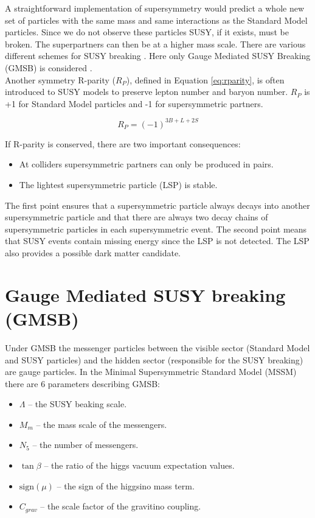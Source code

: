 A straightforward implementation of supersymmetry would predict a whole new set
of particles with the same mass and same interactions as the Standard Model
particles. Since we do not observe these particles SUSY, if it exists, must be 
broken. The superpartners can then be at a higher mass scale. There are various
different schemes for SUSY breaking \cite{atchinson}. Here only Gauge Mediated 
SUSY Breaking (GMSB) is considered \cite{tewort}. \\

Another symmetry R-parity ($R_{P}$), defined in Equation \ref{eq:rparity}, is 
often introduced to SUSY models to preserve lepton number and baryon number. 
$R_{P}$ is +1 for Standard Model particles and -1 for supersymmetric partners.

\begin{equation}
R_{P} = (-1)^{3B+L+2S}
\label{eq:rparity}
\end{equation}

If R-parity is conserved, there are two important consequences:

\begin{itemize}
\item At colliders supersymmetric partners can only be produced in pairs.
\item The lightest supersymmetric particle (LSP) is stable.
\end{itemize}

The first point ensures that a supersymmetric particle always decays into 
another supersymmetric particle and that there are always two decay chains of 
supersymmetric particles in each supersymmetric event. The second point means 
that SUSY events contain missing energy since the LSP is not detected. The LSP 
also provides a possible dark matter candidate.

\section{Gauge Mediated SUSY breaking (GMSB)}

Under GMSB the messenger particles between the visible sector (Standard Model
and SUSY particles) and the hidden sector (responsible for the SUSY breaking)
are gauge particles. In the Minimal Supersymmetric Standard Model (MSSM) there 
are 6 parameters describing GMSB:

\begin{itemize}
\item $\Lambda$ -- the SUSY beaking scale. 
\item $M_{m}$ -- the mass scale of the messengers.
\item $N_{5}$ -- the number of messengers.
\item $\tan\beta$ -- the ratio of the higgs vacuum expectation values.
\item $\mbox{sign}(\mu)$ -- the sign of the higgsino mass term.
\item $C_{grav}$ -- the scale factor of the gravitino coupling.
\end{itemize}


